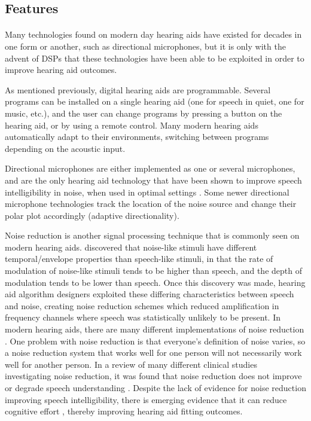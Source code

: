 \subsection{Features}
\paragraph{}Many technologies found on modern day hearing aids have existed for decades in one form or another, such as directional microphones, but it is only with the advent of DSPs that these technologies have been able to be exploited in order to improve hearing aid outcomes.

As mentioned previously, digital hearing aids are programmable.  Several programs can be installed on a single hearing aid (one for speech in quiet, one for music, etc.), and the user can change programs by pressing a button on the hearing aid, or by using a remote control.  Many modern hearing aids automatically adapt to their environments, switching between programs depending on the acoustic input.

Directional microphones are either implemented as one or several microphones, and are the only hearing aid technology that have been shown to improve speech intelligibility in noise, when used in optimal settings \cite{McCreery2012}.  Some newer directional microphone technologies track the location of the noise source and change their polar plot accordingly (adaptive directionality).

Noise reduction is another signal processing technique that is commonly seen on modern hearing aids.   discovered that noise-like stimuli have different temporal/envelope properties than speech-like stimuli, in that the rate of modulation of noise-like stimuli tends to be higher than speech, and the depth of modulation tends to be lower than speech.  Once this discovery was made, hearing aid algorithm designers exploited these differing characteristics between speech and noise, creating noise reduction schemes which reduced amplification in frequency channels where speech was statistically unlikely to be present.  In modern hearing aids, there are many different implementations of noise reduction \cite{Bentler2006}.  One problem with noise reduction is that everyone's definition of noise varies, so a noise reduction system that works well for one person will not necessarily work well for another person.  In a review of many different clinical studies investigating noise reduction, it was found that noise reduction does not improve or degrade speech understanding \cite{McCreery2012}.  Despite the lack of evidence for noise reduction improving speech intelligibility, there is emerging evidence that it can reduce cognitive effort \cite{Sarampalis2009}, thereby improving hearing aid fitting outcomes.

